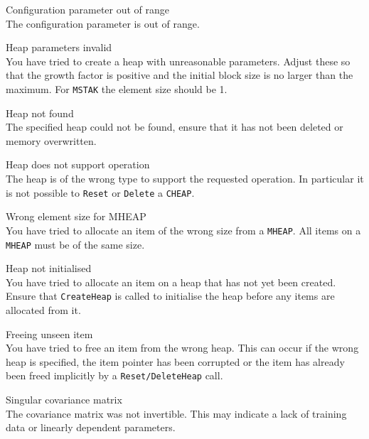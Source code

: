\begin{itemize}
\begin{itemize}
    Configuration parameter out of range\\
        The configuration parameter is out of range.  

\end{itemize}


\begin{itemize}
    Heap parameters invalid\\
        You have tried to create a heap with unreasonable parameters.  Adjust 
        these so that the growth factor is positive and the initial block 
        size is no larger than the maximum.  For \texttt{MSTAK} the element 
        size should be 1.

    Heap not found\\
        The specified heap could not be found, ensure that it has not been 
        deleted or memory overwritten.

    Heap does not support operation\\
        The heap is of the wrong type to support the requested operation.  In 
        particular it is not possible to \texttt{Reset} or \texttt{Delete} a
        \texttt{CHEAP}.

    Wrong element size for MHEAP\\
        You have tried to allocate an item of the wrong size from a 
        \texttt{MHEAP}. All items on a \texttt{MHEAP} must be of the same size.

    Heap not initialised\\
        You have tried to allocate an item on a heap that has not yet been 
        created.  Ensure that \texttt{CreateHeap} is called to initialise 
        the heap before any items are allocated from it.

    Freeing unseen item\\
        You have tried to free an item from the wrong heap.  This can occur
        if the wrong heap is specified, the item pointer has been corrupted 
        or the item has already been freed implicitly by a 
        \texttt{Reset/DeleteHeap} call.  

\end{itemize}
 
 
\begin{itemize}
    Singular covariance matrix\\
        The covariance matrix was not invertible.  This may indicate a lack
        of training data or linearly dependent parameters.


\end{itemize}
\end{itemize}
